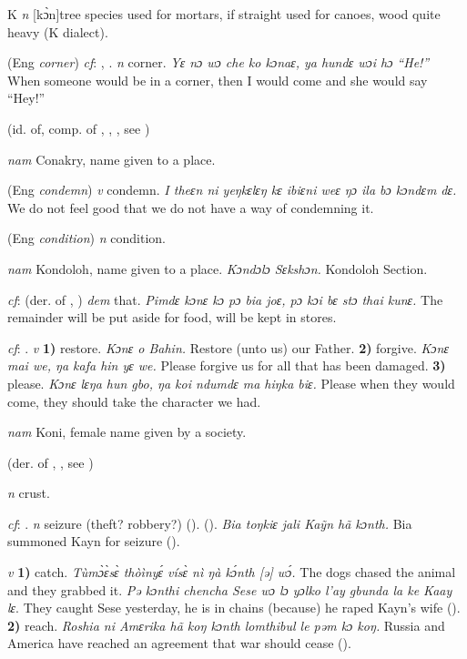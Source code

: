 \begin{letter}{K}
 \textit{n} [kɔ̀n]tree species used for mortars, if straight used for canoes, wood quite heavy (K dialect). 

 (Eng \textit{corner}) \textit{cf}: , . \textit{n} corner. \textit{Yɛ nɔ wɔ che ko kɔnaɛ, ya hundɛ wɔi hɔ “He!”} When someone would be in a corner, then I would come and she would say “Hey!”

 (id. of, comp. of , , , see ) 

 \textit{nam} Conakry, name given to a place. 

 (Eng \textit{condemn}) \textit{v} condemn. \textit{I theɛn ni yeŋkɛlɛŋ kɛ ibiɛni weɛ ŋɔ ila bɔ kɔndɛm dɛ.} We do not feel good that we do not have a way of condemning it.

 (Eng \textit{condition}) \textit{n} condition.

 \textit{nam} Kondoloh, name given to a place. \textit{Kɔndɔlɔ Sɛkshɔn.} Kondoloh Section.

 \textit{cf}:  (der. of , ) \textit{dem} that. \textit{Pimdɛ kɔnɛ kɔ pɔ bia joɛ, pɔ kɔi bɛ stɔ thai kunɛ.} The remainder will be put aside for food, will be kept in stores.

 \textit{cf}: . \textit{v} \textbf{1)} restore. \textit{Kɔnɛ o Bahin.} Restore (unto us) our Father. \textbf{2)} forgive. \textit{Kɔnɛ mai we, ŋa kafa hin yɛ we.} Please forgive us for all that has been damaged. \textbf{3)} please. \textit{Kɔnɛ lɛŋa hun gbo, ŋa koi ndumdɛ ma hiŋka biɛ.} Please when they would come, they should take the character we had.

 \textit{nam} Koni, female name given by a society. 

 (der. of , , see ) 

 \textit{n} crust.

 \textit{cf}: . \textit{n} seizure (theft? robbery?) (\citealt{Pichl1967}). (\citealt{Pichl1967}). \textit{Bia toŋkiɛ jali Kaỹn hã kɔnth.} Bia summoned Kayn for seizure (\citealt{Pichl1967}).

 \textit{v} \textbf{1)} catch. \textit{Tùmɔ̀ɛ̀sɛ̀ thòìnyɛ́ vísɛ̀ nì ŋà kɔ́nth [ə] wɔ́.} The dogs chased the animal and they grabbed it. \textit{Pə kɔnthi chencha Sese wɔ lɔ yɔlko l'ay gbunda la ke Kaay lɛ}. They caught Sese yesterday, he is in chains (because) he raped Kayn's wife (\citealt{Pichl1967}). \textbf{2)} reach. \textit{Roshia ni Amɛrika hã koŋ kɔnth lomthibul le pəm kɔ koŋ.} Russia and America have reached an agreement that war should cease (\citealt{Pichl1967}). 


\end{letter}

